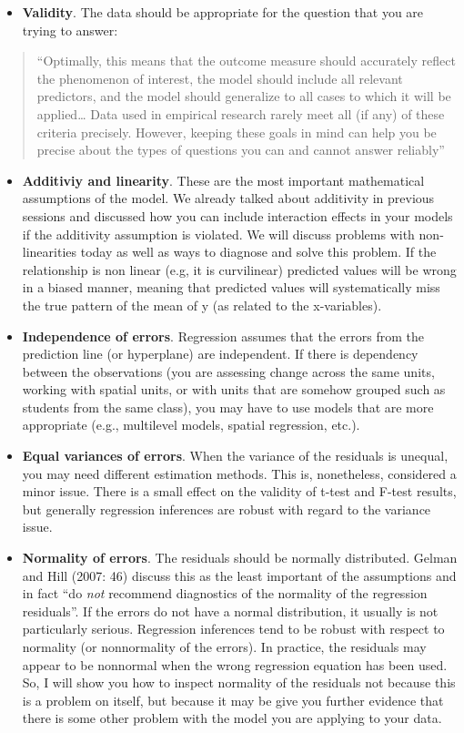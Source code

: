 \documentclass[]{book}
\providecommand{\tightlist}{%
  \setlength{\itemsep}{0pt}\setlength{\parskip}{0pt}}
\begin{document}
\begin{itemize}
\tightlist
\item
  \textbf{Validity}. The data should be appropriate for the question that you are trying to answer:
\end{itemize}

\begin{quote}
``Optimally, this means that the outcome measure should accurately reflect the phenomenon of interest, the model should include all relevant predictors, and the model should generalize to all cases to which it will be applied\ldots{} Data used in empirical research rarely meet all (if any) of these criteria precisely. However, keeping these goals in mind can help you be precise about the types of questions you can and cannot answer reliably''
\end{quote}

\begin{itemize}
\item
  \textbf{Additiviy and linearity}. These are the most important mathematical assumptions of the model. We already talked about additivity in previous sessions and discussed how you can include interaction effects in your models if the additivity assumption is violated. We will discuss problems with non-linearities today as well as ways to diagnose and solve this problem. If the relationship is non linear (e.g, it is curvilinear) predicted values will be wrong in a biased manner, meaning that predicted values will systematically miss the true pattern of the mean of y (as related to the x-variables).
\item
  \textbf{Independence of errors}. Regression assumes that the errors from the prediction line (or hyperplane) are independent. If there is dependency between the observations (you are assessing change across the same units, working with spatial units, or with units that are somehow grouped such as students from the same class), you may have to use models that are more appropriate (e.g., multilevel models, spatial regression, etc.).
\item
  \textbf{Equal variances of errors}. When the variance of the residuals is unequal, you may need different estimation methods. This is, nonetheless, considered a minor issue. There is a small effect on the validity of t-test and F-test results, but generally regression inferences are robust with regard to the variance issue.
\item
  \textbf{Normality of errors}. The residuals should be normally distributed. Gelman and Hill (2007: 46) discuss this as the least important of the assumptions and in fact ``do \emph{not} recommend diagnostics of the normality of the regression residuals''. If the errors do not have a normal distribution, it usually is not particularly serious. Regression inferences tend to be robust with respect to normality (or nonnormality of the errors). In practice, the residuals may appear to be nonnormal when the wrong regression equation has been used. So, I will show you how to inspect normality of the residuals not because this is a problem on itself, but because it may be give you further evidence that there is some other problem with the model you are applying to your data.
\end{itemize}
\end{document}
